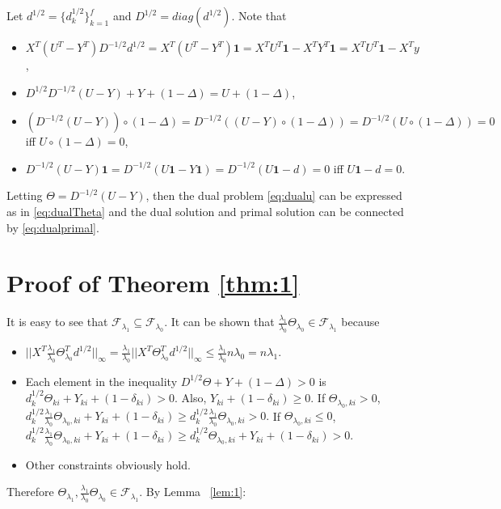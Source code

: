 Let $d^{1/2}=\{d_k^{1/2}\}_{k=1}^f$ and $D^{1/2}=diag(d^{1/2})$. Note that \begin{itemize}
    \item $X^T(U^T-Y^T)D^{-1/2}d^{1/2}=X^T(U^T-Y^T)\mathbf{1}=X^TU^T\mathbf{1}-X^TY^T\mathbf{1}=X^TU^T\mathbf{1}-X^Ty$,
    \item $D^{1/2}D^{-1/2}(U-Y)+Y+(1-\Delta)=U+(1-\Delta)$,
    \item $\left(D^{-1/2}(U-Y)\right)\circ(1-\Delta)=D^{-1/2}\left((U-Y)\circ(1-\Delta)\right)=D^{-1/2}\left(U\circ(1-\Delta)\right)=0$ iff $U\circ(1-\Delta)=0$,
    \item $D^{-1/2}(U-Y)\mathbf{1}=D^{-1/2}(U\mathbf{1}-Y\mathbf{1})=D^{-1/2}(U\mathbf{1}-d)=0$ iff $U\mathbf{1}-d=0$.
\end{itemize}
Letting $\Theta=D^{-1/2}(U-Y)$, then the dual problem \eqref{eq:dualu} can be expressed as in \eqref{eq:dualTheta} and the dual solution and primal solution can be connected by \eqref{eq:dualprimal}.


\section{Proof of Theorem \ref{thm:1}}


It is easy to see that $\mathcal{F}_{\lambda_1}\subseteq\mathcal{F}_{\lambda_0}$. It can be shown that $\frac{\lambda_1}{\lambda_0}\Theta_{\lambda_0}\in\mathcal{F}_{\lambda_1}$ because

\begin{itemize}
    \item $||X^T\frac{\lambda_1}{\lambda_0}\Theta_{\lambda_0}^Td^{1/2}||_\infty=\frac{\lambda_1}{\lambda_0}||X^T\Theta_{\lambda_0}^Td^{1/2}||_\infty\leq \frac{\lambda_1}{\lambda_0}n\lambda_0=n\lambda_1$.
    \item Each element in the inequality $D^{1/2}\Theta+Y+(1-\Delta)> 0$ is $d_k^{1/2}\Theta_{ki}+Y_{ki}+(1-\delta_{ki})>0$. Also, $Y_{ki}+(1-\delta_{ki})\geq 0$. If $\Theta_{\lambda_0,ki}>0$, $d_k^{1/2}\frac{\lambda_1}{\lambda_0}\Theta_{\lambda_0,ki}+Y_{ki}+(1-\delta_{ki})\geq d_k^{1/2}\frac{\lambda_1}{\lambda_0}\Theta_{\lambda_0,ki}>0.$ If $\Theta_{\lambda_0,ki}\leq0$, $d_k^{1/2}\frac{\lambda_1}{\lambda_0}\Theta_{\lambda_0,ki}+Y_{ki}+(1-\delta_{ki})\geq d_k^{1/2}\Theta_{\lambda_0,ki}+Y_{ki}+(1-\delta_{ki})>0.$
    \item Other constraints obviously hold.
\end{itemize}
Therefore $\Theta_{\lambda_1},\frac{\lambda_1}{\lambda_0}\Theta_{\lambda_0}\in \mathcal{F}_{\lambda_1}$. By Lemma ~\ref{lem:1}:

